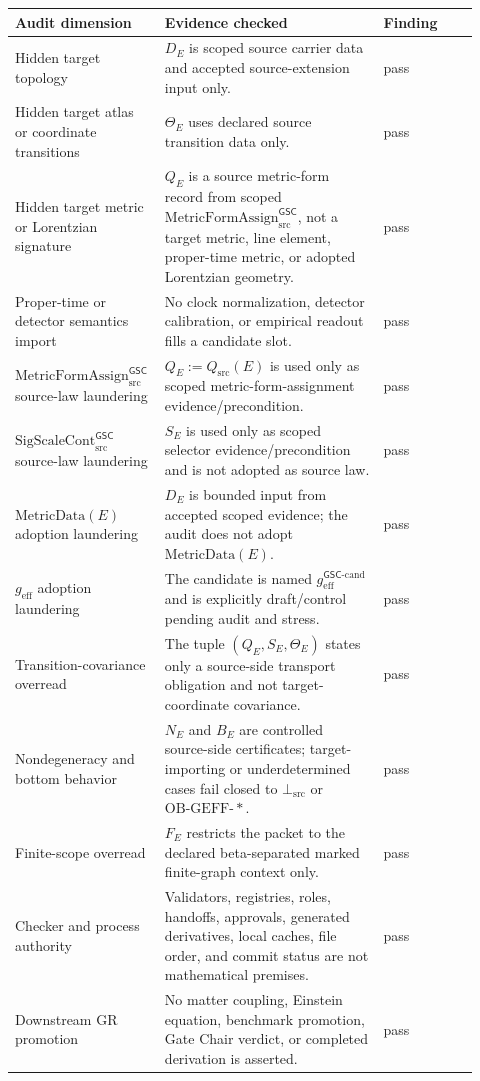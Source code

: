 \documentclass[11pt]{article}
\newcommand{\SigScaleCont}{\mathrm{SigScaleCont}^{\mathsf{GSC}}_{\mathrm{src}}}
\newcommand{\MetricFormAssign}{\mathrm{MetricFormAssign}^{\mathsf{GSC}}_{\mathrm{src}}}
\newcommand{\geff}{g_{\mathrm{eff}}}
\newcommand{\geffCand}{g_{\mathrm{eff}}^{\mathsf{GSC}\mbox{-}\mathrm{cand}}}
\newcommand{\BottomSrc}{\bot_{\mathrm{src}}}
\newcommand{\OBGEFF}{\mathrm{OB\mbox{-}GEFF}}
\begin{document}
\begin{longtable}{p{0.26\linewidth}p{0.46\linewidth}p{0.20\linewidth}}
\toprule
Audit dimension & Evidence checked & Finding \\
\midrule
Hidden target topology & \(D_E\) is scoped source carrier data and accepted
source-extension input only. & pass \\
Hidden target atlas or coordinate transitions & \(\Theta_E\) uses declared
source transition data only. & pass \\
Hidden target metric or Lorentzian signature & \(Q_E\) is a source
metric-form record from scoped \(\MetricFormAssign\), not a target metric,
line element, proper-time metric, or adopted Lorentzian geometry. & pass \\
Proper-time or detector semantics import & No clock normalization, detector
calibration, or empirical readout fills a candidate slot. & pass \\
\(\MetricFormAssign\) source-law laundering & \(Q_E:=Q_{\mathrm{src}}(E)\)
is used only as scoped metric-form-assignment evidence/precondition. & pass \\
\(\SigScaleCont\) source-law laundering & \(S_E\) is used only as scoped
selector evidence/precondition and is not adopted as source law. & pass \\
\(\mathrm{MetricData}(E)\) adoption laundering & \(D_E\) is bounded input
from accepted scoped evidence; the audit does not adopt \(\mathrm{MetricData}(E)\). & pass \\
\(\geff\) adoption laundering & The candidate is named \(\geffCand\) and is
explicitly draft/control pending audit and stress. & pass \\
Transition-covariance overread & The tuple \((Q_E,S_E,\Theta_E)\) states only
a source-side transport obligation and not target-coordinate covariance. & pass \\
Nondegeneracy and bottom behavior & \(N_E\) and \(B_E\) are controlled
source-side certificates; target-importing or underdetermined cases fail
closed to \(\BottomSrc\) or \(\OBGEFF\mbox{-}*\). & pass \\
Finite-scope overread & \(F_E\) restricts the packet to the declared
beta-separated marked finite-graph context only. & pass \\
Checker and process authority & Validators, registries, roles, handoffs,
approvals, generated derivatives, local caches, file order, and commit status
are not mathematical premises. & pass \\
Downstream GR promotion & No matter coupling, Einstein equation, benchmark
promotion, Gate Chair verdict, or completed derivation is asserted. & pass \\
\bottomrule
\end{longtable}
\end{document}
